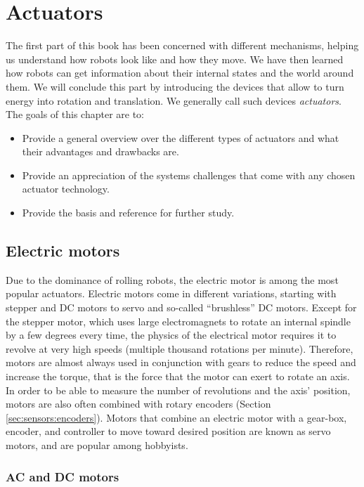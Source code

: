 \chapter{Actuators}
The first part of this book has been concerned with different mechanisms, helping us understand how robots look like and how they move. We have then learned how robots can get information about their internal states and the world around them. We will conclude this part by introducing the devices that allow to turn energy into rotation and translation. We generally call such devices \textsl{actuators}. The goals of this chapter are to:

\begin{itemize}
\item Provide a general overview over the different types of actuators and what their advantages and drawbacks are.
\item Provide an appreciation of the systems challenges that come with any chosen actuator technology.
\item Provide the basis and reference for further study.
\end{itemize}

\section{Electric motors}

Due to the dominance of rolling robots, the electric motor \cite{hughes2019electric} is among the most popular actuators. Electric motors come in different variations, starting with stepper and DC motors to servo and so-called ``brushless'' DC motors. Except for the stepper motor, which uses large electromagnets to rotate an internal spindle by a few degrees every time, the physics of the electrical motor requires it to revolve at very high speeds (multiple thousand rotations per minute). Therefore, motors are almost always used in conjunction with gears to reduce the speed and increase the torque, that is the force that the motor can exert to rotate an axis. In order to be able to measure the number of revolutions and the axis' position, motors are also often combined with rotary encoders (Section \ref{sec:sensors:encoders}). Motors that combine an electric motor with a gear-box, encoder, and controller to move toward desired position are known as servo motors, and are popular among hobbyists.

\subsection{AC and DC motors}

